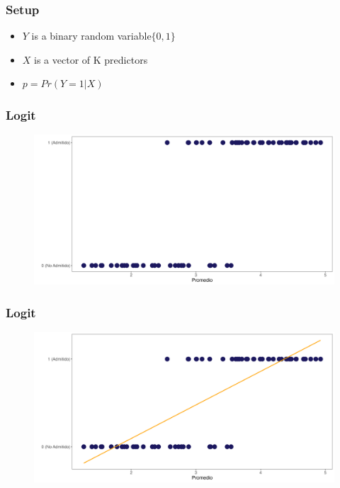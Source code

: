 \documentclass[
  shownotes,
  xcolor={svgnames},
  hyperref={colorlinks,citecolor=DarkBlue,linkcolor=andesred,urlcolor=DarkBlue}
  , aspectratio=169]{beamer}
\begin{document}
\begin{frame}[fragile]
\frametitle{Setup}


\begin{itemize}

  \item  $Y$ is a binary random variable$\{0,1\}$
  \medskip
  \item $X$ is a vector of K predictors
  \medskip
  
  \item $p=Pr(Y=1|X)$
  
  \end{itemize}

\end{frame}
\begin{frame}[fragile]
\frametitle{Logit}



        \begin{figure}[H] \centering
            \captionsetup{justification=centering}
              \includegraphics[scale=0.45]{figures/fig1}
              
 \end{figure}


\end{frame}
\begin{frame}[fragile]
\frametitle{Logit}



        \begin{figure}[H] \centering
            \captionsetup{justification=centering}
              \includegraphics[scale=0.45]{figures/fig2}
              
 \end{figure}



\end{frame}
\end{document}
